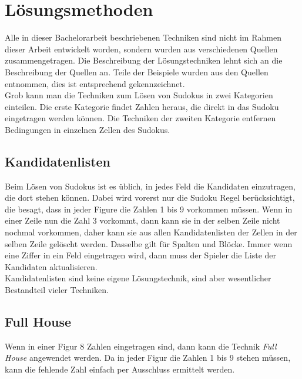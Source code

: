 \documentclass[accentcolor=tud6b,11pt,paper=a4]{tudreport}
\begin{document}
\chapter{Lösungsmethoden}
Alle in dieser Bachelorarbeit beschriebenen Techniken sind nicht im Rahmen dieser Arbeit entwickelt worden, sondern wurden aus verschiedenen Quellen zusammengetragen. Die Beschreibung der Lösungstechniken lehnt sich an die Beschreibung der Quellen an. Teile der Beispiele wurden aus den Quellen entnommen, dies ist entsprechend gekennzeichnet.\\
Grob kann man die Techniken zum Lösen von Sudokus in zwei Kategorien einteilen. Die erste Kategorie findet Zahlen heraus, die direkt in das Sudoku eingetragen werden können. Die Techniken der zweiten Kategorie entfernen Bedingungen in einzelnen Zellen des Sudokus.

\section{Kandidatenlisten}
\label{Kandidatenlisten}
Beim Lösen von Sudokus ist es üblich, in jedes Feld die Kandidaten einzutragen, die dort stehen können. Dabei wird vorerst nur die Sudoku Regel berücksichtigt, die besagt, dass in jeder Figure die Zahlen 1 bis 9 vorkommen müssen. Wenn in einer Zeile nun die Zahl 3 vorkommt, dann kann sie in der selben Zeile nicht nochmal vorkommen, daher kann sie aus allen Kandidatenlisten der Zellen in der selben Zeile gelöscht werden. Dasselbe gilt für Spalten und Blöcke. Immer wenn eine Ziffer in ein Feld eingetragen wird, dann muss der Spieler die Liste der Kandidaten aktualisieren.\\
Kandidatenlisten sind keine eigene Lösungstechnik, sind aber wesentlicher Bestandteil vieler Techniken.

\newpage
\section{Full House}
Wenn in einer Figur 8 Zahlen eingetragen sind, dann kann die Technik \textit{Full House} angewendet werden. Da in jeder Figur die Zahlen 1 bis 9 stehen müssen, kann die fehlende Zahl einfach per Ausschluss ermittelt werden.\\
\end{document}

